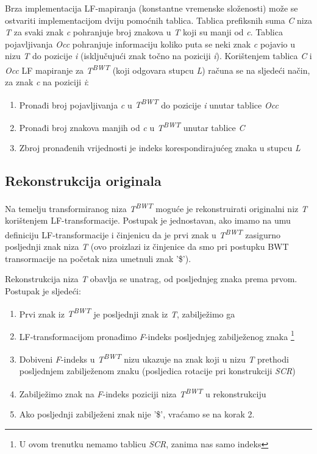 \documentclass[times, utf8, seminar, numeric]{fer}
\begin{document}
Brza implementacija LF-mapiranja (konstantne
vremenske složenosti) može se ostvariti implementacijom dviju pomoćnih tablica. Tablica
prefiksnih suma \textit{C}  niza \textit{T} za svaki znak \textit{c}
pohranjuje broj znakova u \textit{T} koji su manji od \textit{c}. Tablica pojavljivanja
\textit{Occ}  pohranjuje informaciju koliko puta se neki znak
\textit{c} pojavio u nizu \textit{T} do pozicije \textit{i} (isključujući znak točno na
poziciji \textit{i}). Korištenjem tablica \textit{C} i \textit{Occ} LF mapiranje za
\textit{T\textsuperscript{BWT}} (koji odgovara stupcu \textit{L}) računa se na sljedeći način,
za znak \textit{c} na poziciji \textit{i}:

\begin{enumerate}
  \item{Pronađi broj pojavljivanja \textit{c} u \textit{T\textsuperscript{BWT}} do pozicije \textit{i} unutar tablice \textit{Occ}}
  \item{Pronađi broj znakova manjih od \textit{c} u \textit{T\textsuperscript{BWT}} unutar tablice \textit{C}}
  \item{Zbroj pronađenih vrijednosti je indeks korespondirajućeg znaka u stupcu \textit{L}}
\end{enumerate}

\subsection{Rekonstrukcija originala}

Na temelju transformiranog niza \textit{T\textsuperscript{BWT}} moguće je rekonstruirati
originalni niz \textit{T} korištenjem LF-transformacije. Postupak je jednostavan, ako imamo
na umu definiciju LF-transformacije i činjenicu da je prvi znak u \textit{T\textsuperscript{BWT}}
zasigurno posljednji znak niza \textit{T} (ovo proizlazi iz činjenice da smo pri postupku BWT
transormacije na početak niza umetnuli znak '\$').

Rekonstrukcija niza \textit{T} obavlja se unatrag, od posljednjeg znaka prema prvom. Postupak
je sljedeći:

\begin{enumerate}
  \item{Prvi znak iz \textit{T\textsuperscript{BWT}} je posljednji znak iz \textit{T}, zabilježimo ga}
  \item{LF-transformacijom pronađimo \textit{F}-indeks  posljednjeg zabilježenog znaka \footnote{
    U ovom trenutku nemamo tablicu \textit{SCR}, zanima nas samo indeks}}
  \item{Dobiveni \textit{F}-indeks u \textit{T\textsuperscript{BWT}} nizu ukazuje na znak koji u nizu
    \textit{T} prethodi posljednjem zabilježenom znaku (posljedica rotacije pri konstrukciji \textit{SCR})}
  \item{Zabilježimo znak na \textit{F}-indeks poziciji niza \textit{T\textsuperscript{BWT}} u rekonstrukciju}
  \item{Ako posljednji zabilježeni znak nije '\$', vraćamo se na korak 2.}
\end{enumerate}
\end{document}
